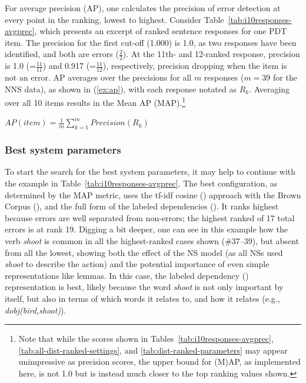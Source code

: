 For average precision (AP), one calculates the precision of error
detection at every point in the ranking, lowest to highest. Consider
Table~\ref{tab:i10responses-avgprec}, which presents an excerpt of ranked sentence
responses for one PDT item. The precision for
the first cut-off (1.000) is 1.0, as two responses have been
identified, and both are errors ($\frac{2}{2}$). At the 11th- and
12-ranked response, precision is 1.0 (=$\frac{11}{11}$) and 0.917
(=$\frac{11}{12}$), respectively, precision dropping when the item is
not an error.
AP averages over the precisions for all $m$ responses ($m=39$ for the
NNS data), as shown in (\ref{ex:ap}), with each response notated as
$R_k$.  Averaging over all 10 items results in the Mean AP (MAP).\footnote{Note that while the scores shown in Tables~\ref{tab:i10responses-avgprec}, \ref{tab:all-dist-ranked-settings}, and \ref{tab:dist-ranked-parameters} may appear unimpressive as precision scores, the upper bound for (M)AP, as implemented here, is not 1.0 but is instead much closer to the top ranking values shown.}



\begin{exe}
\ex\label{ex:ap} $AP(item) = \frac{1}{m} \sum\limits_{k=1}^m
Precision(R_k)$
\end{exe}

\subsubsection{Best system parameters} 

To start the search for the best system parameters, it may help to
continue with the example in
Table~\ref{tab:i10responses-avgprec}. The best configuration, as determined by the
MAP metric, uses the tf-idf cosine () approach with the Brown Corpus (), and the full form of the labeled dependencies (). It ranks highest because errors are
well separated from non-errors; the highest ranked of 17 total errors
is at rank 19.  Digging a bit deeper, one can see in this example how
the verb \textit{shoot} is common in all the highest-ranked cases shown
(\#37--39), but absent from all the lowest, showing both the effect of
the NS model (as all NSs used \textit{shoot} to describe the action) and the
potential importance of even simple representations like lemmas.  In
this case, the labeled dependency () representation is best, likely because the
word \textit{shoot} is not only important by itself, but also in terms
of which words it relates to, and how it relates (e.g.,
\textit{dobj(bird,shoot)}).

